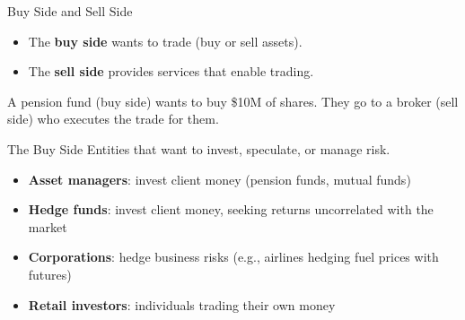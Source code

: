 \begin{frame}{Buy Side and Sell Side}
  \begin{sqt:definition}
    \begin{itemize}
      \item The \textbf{buy side} wants to trade (buy or sell assets).
      \item The \textbf{sell side} provides services that enable trading.
    \end{itemize}
  \end{sqt:definition}

  \vspace{0.3cm}
  \begin{sqt:tip}
    A pension fund (buy side) wants to buy \$10M of shares.
    They go to a broker (sell side) who executes the trade for them.
  \end{sqt:tip}
\end{frame}

\begin{frame}{The Buy Side}
  Entities that want to invest, speculate, or manage risk.

  \vspace{0.3cm}
  \begin{itemize}
    \item \textbf{Asset managers}: invest client money (pension funds, mutual funds)
    \item \textbf{Hedge funds}: invest client money, seeking returns uncorrelated with the market
    \item \textbf{Corporations}: hedge business risks (e.g., airlines hedging fuel prices with futures)
    \item \textbf{Retail investors}: individuals trading their own money
  \end{itemize}
\end{frame}

